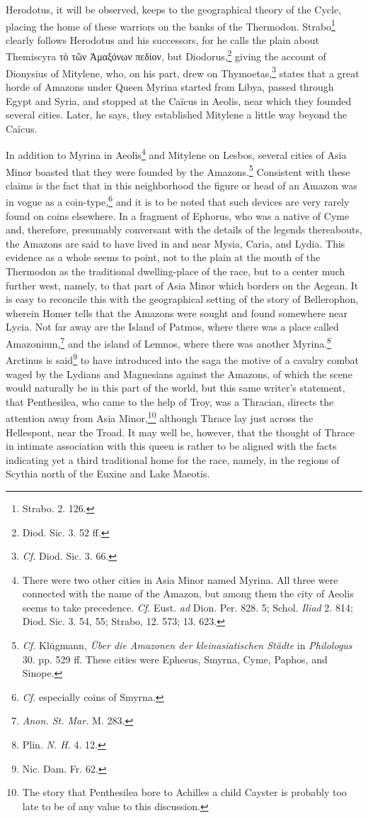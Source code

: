 \documentclass[a4paper, 12pt, oneside]{article}
\begin{document}
Herodotus, it will be observed, keeps to the geographical theory of the Cycle, placing the home of these warriors on the banks of the Thermodon. Strabo\footnote{Strabo. 2. 126.} clearly follows Herodotus and his successors, for he calls the plain about Themiscyra τὸ τῶν Ἀμαξόνων πεδίον, but Diodorus,\footnote{Diod. Sic. 3. 52 ff.} giving the account of Dionysius of Mitylene, who, on his part, drew on Thymoetas,\footnote{\emph{Cf.} Diod. Sic. 3. 66.} states that a great horde of Amazons under Queen Myrina started from Libya, passed through Egypt and Syria, and stopped at the Caïcus in Aeolis, near which they founded several cities. Later, he says, they established Mitylene a little way beyond the Caïcus.

In addition to Myrina in Aeolis\footnote{There were two other cities in Asia Minor named Myrina. All three were connected with the name of the Amazon, but among them the city of Aeolis seems to take precedence. \emph{Cf.} Eust. \emph{ad} Dion. Per. 828. 5; Schol. \emph{Iliad} 2. 814; Diod. Sic. 3. 54, 55; Strabo, 12. 573; 13. 623.} and Mitylene on Lesbos, several cities of Asia Minor boasted that they were founded by the Amazons.\footnote{\emph{Cf.} Klügmann, \emph{Über die Amazonen der kleinasiatischen Städte} in \emph{Philologus} 30. pp. 529 ff. These cities were Ephesus, Smyrna, Cyme, Paphos, and Sinope.} Consistent with these claims is the fact that in this neighborhood the figure or head of an Amazon was in vogue as a coin-type,\footnote{\emph{Cf.} especially coins of Smyrna.} and it is to be noted that such devices are very rarely found on coins elsewhere. In a fragment of Ephorus, who was a native of Cyme and, therefore, presumably conversant with the details of the legends thereabouts, the Amazons are said to have lived in and near Mysia, Caria, and Lydia. This evidence as a whole seems to point, not to the plain at the mouth of the Thermodon as the traditional dwelling-place of the race, but to a center much further west, namely, to that part of Asia Minor which borders on the Aegean. It is easy to reconcile this with the geographical setting of the story of Bellerophon, wherein Homer tells that the Amazons were sought and found somewhere near Lycia. Not far away are the Island of Patmos, where there was a place called Amazonium,\footnote{\emph{Anon. St. Mar.} M. 283.} and the island of Lemnos, where there was another Myrina.\footnote{Plin. \emph{N. H.} 4. 12.} Arctinus is said\footnote{Nic. Dam. Fr. 62.} to have introduced into the saga the motive of a cavalry combat waged by the Lydians and Magnesians against the Amazons, of which the scene would naturally be in this part of the world, but this same writer's statement, that Penthesilea, who came to the help of Troy, was a Thracian, directs the attention away from Asia Minor,\footnote{The story that Penthesilea bore to Achilles a child Cayster is probably too late to be of any value to this discussion.} although Thrace lay just across the Hellespont, near the Troad. It may well be, however, that the thought of Thrace in intimate association with this queen is rather to be aligned with the facts indicating yet a third traditional home for the race, namely, in the regions of Scythia north of the Euxine and Lake Maeotis.
\end{document}
